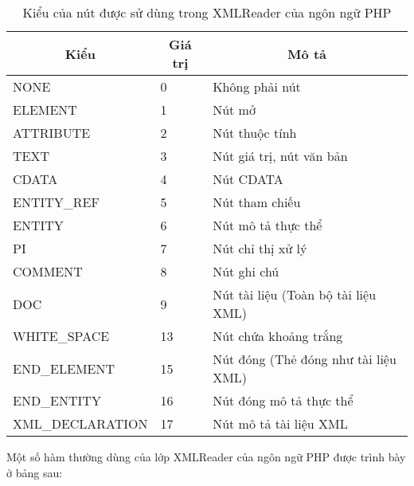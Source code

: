 \begin{center}
\begin{longtable}{|m{4.5cm}|m{2cm}| m{4cm}|}
\caption [Kiểu của nút được sử dụng trong XMLReader của ngôn ngữ PHP]{Kiểu của nút được sử dùng trong XMLReader của ngôn ngữ PHP}
 \endfirsthead
 \endhead
\hline

\multicolumn{1}{|c|}{\textbf{Kiểu}} &	\multicolumn{1}{c|}{\textbf{Giá trị}} &	\multicolumn{1}{c|}{\textbf{Mô tả}}\\ \hline
NONE &	0 &	Không phải nút\\ \hline
ELEMENT &	1 &	Nút mở \\ \hline
ATTRIBUTE &	2 &	Nút thuộc tính\\ \hline
TEXT &	3 &	Nút giá trị, nút văn bản\\ \hline
CDATA &	4 &	Nút CDATA\\ \hline
ENTITY\_REF &	5 &	Nút tham chiếu\\ \hline
ENTITY & 	6 &	Nút mô tả thực thể\\ \hline
PI &	7 &	Nút chỉ thị xử lý\\ \hline
COMMENT &	8 &	Nút ghi chú\\ \hline
DOC &	9 &	Nút tài liệu (Toàn bộ tài liệu XML) \\ \hline
WHITE\_SPACE & 	13 &	Nút chứa khoảng trắng\\ \hline
END\_ELEMENT &	15 &	Nút đóng (Thẻ đóng như tài liệu XML) \\ \hline
END\_ENTITY	& 16 &	Nút đóng mô tả thực thể\\ \hline
XML\_DECLARATION &	17 &	Nút mô tả tài liệu XML\\ \hline

\end{longtable}
\end{center}
\vspace{-1cm}

Một số hàm thường dùng của lớp XMLReader của ngôn ngữ PHP được trình bày ở bảng sau:

